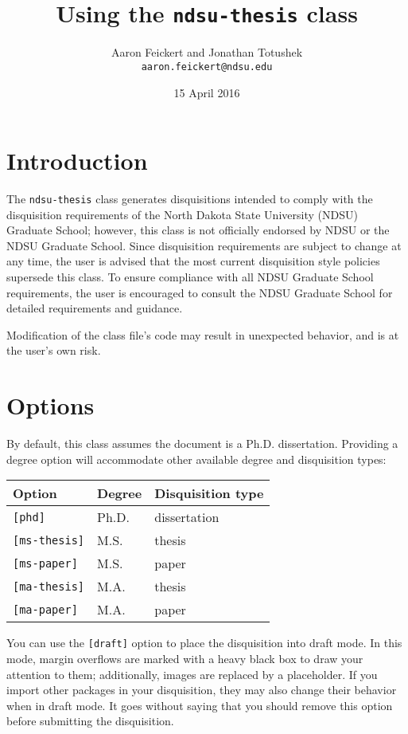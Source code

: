 \documentclass{article}
\title{Using the \texttt{ndsu-thesis} class}
\author{Aaron Feickert and Jonathan Totushek \\ \texttt{aaron.feickert@ndsu.edu}}
\date{15 April 2016}
\begin{document}
\maketitle

\section{Introduction}
The \texttt{ndsu-thesis} class generates disquisitions intended to comply with the disquisition requirements of the North Dakota State University (NDSU) Graduate School; however, this class is not officially endorsed by NDSU or the NDSU Graduate School. Since disquisition requirements are subject to change at any time, the user is advised that the most current disquisition style policies supersede this class. To ensure compliance with all NDSU Graduate School requirements, the user is encouraged to consult the NDSU Graduate School for detailed requirements and guidance.

Modification of the class file's code may result in unexpected behavior, and is at the user's own risk.

\section{Options}
By default, this class assumes the document is a Ph.D. dissertation. Providing a degree option will accommodate other available degree and disquisition types:
\begin{center}
\begin{tabular}{lll}
Option & Degree & Disquisition type \\
\hline
\texttt{[phd]} & Ph.D. & dissertation \\
\texttt{[ms-thesis]} & M.S. & thesis \\
\texttt{[ms-paper]} & M.S. & paper \\
\texttt{[ma-thesis]} & M.A. & thesis \\
\texttt{[ma-paper]} & M.A. & paper \\
\end{tabular}
\end{center}

You can use the \texttt{[draft]} option to place the disquisition into draft mode. In this mode, margin overflows are marked with a heavy black box to draw your attention to them; additionally, images are replaced by a placeholder. If you import other packages in your disquisition, they may also change their behavior when in draft mode. It goes without saying that you should remove this option before submitting the disquisition.
\end{document}
